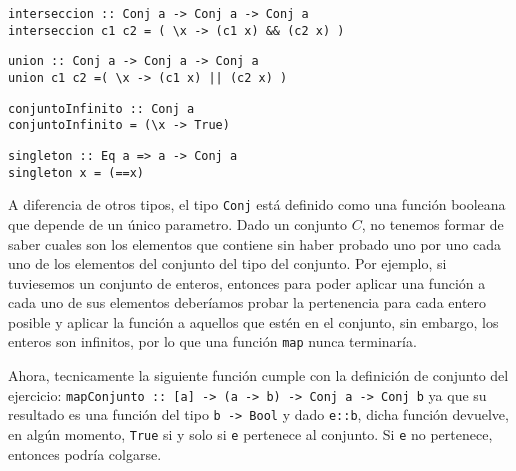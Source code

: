 \begin{centrado}
    \begin{verbatim}
interseccion :: Conj a -> Conj a -> Conj a
interseccion c1 c2 = ( \x -> (c1 x) && (c2 x) )
    \end{verbatim}
\end{centrado}

\begin{centrado}
    \begin{verbatim}
union :: Conj a -> Conj a -> Conj a
union c1 c2 =( \x -> (c1 x) || (c2 x) )
 \end{verbatim}
\end{centrado}

\begin{centrado}
    \begin{verbatim}
conjuntoInfinito :: Conj a
conjuntoInfinito = (\x -> True)
    \end{verbatim}
\end{centrado}

\begin{centrado}
    \begin{verbatim}
singleton :: Eq a => a -> Conj a
singleton x = (==x)
    \end{verbatim}
\end{centrado}

A diferencia de otros tipos, el tipo \texttt{Conj} está definido como una función booleana que depende de un único parametro. Dado un conjunto $C$, no tenemos formar de saber cuales son los elementos que contiene sin haber probado uno por uno cada uno de los elementos del conjunto del tipo del conjunto. Por ejemplo, si tuviesemos un conjunto de enteros, entonces para poder aplicar una función a cada uno de sus elementos deberíamos probar la pertenencia para cada entero posible y aplicar la función a aquellos que estén en el conjunto, sin embargo, los enteros son infinitos, por lo que una función \texttt{map} nunca terminaría.

Ahora, tecnicamente la siguiente función cumple con la definición de conjunto del ejercicio: \texttt{mapConjunto :: [a] -> (a -> b) -> Conj a -> Conj b} ya que su resultado es una función del tipo \texttt{b -> Bool} y dado \texttt{e::b}, dicha función devuelve, en algún momento, \texttt{True} si y solo si \texttt{e} pertenece al conjunto. Si \texttt{e} no pertenece, entonces podría colgarse.

